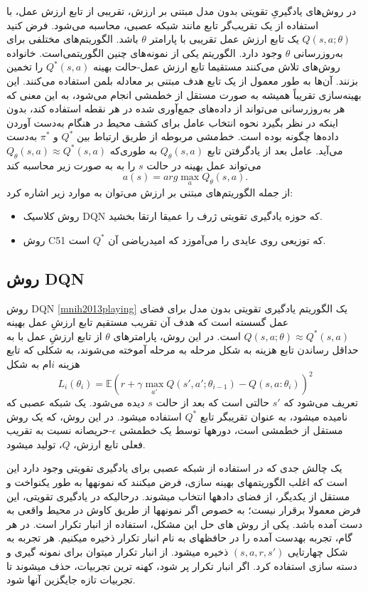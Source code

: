 در روش‌های یادگیریِ تقویتی بدون مدل مبتنی بر ارزش،
تقریبی از تابع ارزش عمل، با استفاده از  یک تقریب‌گر تابع
 مانند شبکه عصبی، محاسبه می‌شود. فرض کنید
$Q(s,a;\theta)$
یک تابع ارزش عمل تقریبی با پارامتر  
$\theta$ 
باشد.
الگوریتم‌های مختلفی برای به‌روزرسانی $\theta$ وجود دارد.
الگوریتم 
  یکی از نمونه‌های چنین الگوریتمی‌است.
  خانواده روش‌های 
    تلاش می‌کنند مستقیما تابع ارزش عمل-حالت بهینه $Q^*(s,a)$ را تخمین بزنند. آن‌ها به طور معمول از یک تابع هدف مبتنی بر معادله بلمن استفاده می‌کنند. این بهینه‌سازی تقریباً همیشه به صورت مستقل از خط\nf مشی انجام می‌شود، به این معنی که هر به‌روزرسانی می‌تواند از داده‌های جمع‌آوری شده در هر نقطه استفاده کند، بدون اینکه در نظر بگیرد نحوه انتخاب عامل برای کشف محیط در هنگام به‌دست آوردن داده‌ها چگونه بوده است. خط‌مشی مربوطه از طریق ارتباط بین 
  $Q^*$
  و
  $\pi^*$
  به‌دست می‌آید. 
  عامل بعد از یادگرفتن تابع $Q_\theta(s,a)$ به طوری‌که  $Q_\theta(s,a) \approx Q^*(s,a)$ می‌تواند عمل بهینه در حالت $s$ را به به صورت زیر محاسبه کند $$a(s) = arg \max_a Q_{\theta}(s,a).$$
  از جمله الگوریتم‌های مبتنی بر ارزش می‌توان به موارد زیر اشاره کرد:
  \begin{itemize}
  	\item روش کلاسیک DQN که حوزه یادگیری تقویتی ژرف را عمیقا ارتقا بخشید.
  	\item روش C51 که توزیعی روی عایدی را می‌آموزد که امیدریاضی آن $Q^*$ است.
  \end{itemize}

\subsection{روش DQN}
روش DQN 
\ref{mnih2013playing}
 یک الگوریتم یادگیری تقویتی بدون مدل برای فضای عمل گسسته است که هدف آن تقریب مستقیم تابع ارزشِ عمل بهینه 
 $Q(s,a; \theta) \approx  Q^*(s,a)$
 است. در این روش، پارامترهای $\theta$ از تابع ارزشِ عمل با به حداقل رساندن تابع هزینه به شکل مرحله به مرحله آموخته می‌شوند، به شکلی که تابع هزینه $i$ام به شکل 
 $$L_i(\theta_i) = \mathbb{E} {\left( r+\gamma \max_{a'} Q(s',a'; \theta_{i-1})- Q(s,a:\theta_i) \right)}^2$$
 تعریف می‌شود که 
$s'$
 حالتی است که بعد از حالت $s$ دیده می‌شود. یک شبکه عصبی که 
\textit{}
  نامیده می\nf شود، به عنوان تقریب\nf گر تابع $Q^*$ استفاده می\nf شود.
در این روش، که یک روش مستقل از خط\nf مشی است، دوره\nf ها توسط یک خط\nf مشی 
$\epsilon$-حریصانه
نسبت به تقریب فعلی تابع ارزش، $Q$، تولید می\nf شود. 

یک چالش جدی که در استفاده از شبکه عصبی برای یادگیری تقویتی وجود دارد این است که اغلب الگوریتم\nf های بهینه سازی، فرض می\nf کنند که نمونه\nf ها به طور یکنواخت و مستقل از یکدیگر، از فضای داده\nf ها انتخاب می\nf شوند. درحالی\nf که در یادگیری تقویتی، این فرض معمولا برقرار نیست؛ به خصوص اگر نمونه\nf ها از طریق کاوش در محیط واقعی به دست آمده باشد. یکی از روش های  حل این مشکل، استفاده از انبار تکرار است. در هر گام، تجربه به\nf دست آمده را در حافظه\nf ای به نام انبار تکرار ذخیره می\nf کنیم. هر تجربه به شکل چهارتایی 
$(s,a,r,s')$
ذخیره می\nf شود. از انبار تکرار می\nf توان برای نمونه گیری و دسته  سازی استفاده کرد. اگر انبار تکرار پر شود، کهنه ترین تجربیات، حذف می\nf شوند تا تجربیات تازه جایگزین آن\nf ها شود.

